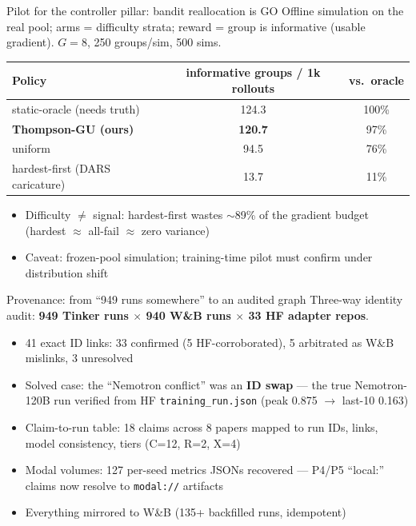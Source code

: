 \documentclass[aspectratio=169,11pt]{beamer}
\newcommand{\good}[1]{\textcolor{green!50!black}{#1}}
\newcommand{\warn}[1]{\textcolor{orange!80!black}{#1}}
\begin{document}
\begin{frame}{Pilot for the controller pillar: bandit reallocation is GO}
  Offline simulation on the real pool; arms = difficulty strata; reward =
  group is informative (usable gradient). $G{=}8$, 250 groups/sim, 500 sims.
  \vspace{4pt}
  \centering
  \begin{tabular}{@{}lcc@{}}
    \toprule
    Policy & informative groups / 1k rollouts & vs.\ oracle \\
    \midrule
    static-oracle (needs truth) & 124.3 & 100\% \\
    \textbf{Thompson-GU (ours)} & \textbf{120.7} & \good{97\%} \\
    uniform & 94.5 & 76\% \\
    hardest-first (DARS caricature) & \warn{13.7} & \warn{11\%} \\
    \bottomrule
  \end{tabular}
  \vspace{6pt}
  \begin{itemize}
    \item Difficulty $\ne$ signal: hardest-first wastes $\sim$89\% of the
          gradient budget (hardest $\approx$ all-fail $\approx$ zero variance)
    \item Caveat: frozen-pool simulation; training-time pilot must confirm
          under distribution shift
  \end{itemize}
\end{frame}

\begin{frame}{Provenance: from ``949 runs somewhere'' to an audited graph}
  Three-way identity audit: \textbf{949 Tinker runs $\times$ 940 W\&B runs
  $\times$ 33 HF adapter repos}.
  \vspace{4pt}
  \begin{itemize}
    \item 41 exact ID links: \good{33 confirmed} (5 HF-corroborated),
          \warn{5 arbitrated as W\&B mislinks}, 3 unresolved
    \item Solved case: the ``Nemotron conflict'' was an \textbf{ID swap} ---
          the true Nemotron-120B run verified from HF
          \texttt{training\_run.json} (peak 0.875 $\to$ last-10 0.163)
    \item Claim-to-run table: 18 claims across 8 papers mapped to run IDs,
          links, model consistency, tiers (C=12, R=2, X=4)
    \item Modal volumes: 127 per-seed metrics JSONs recovered --- P4/P5
          ``local:'' claims now resolve to \texttt{modal://} artifacts
    \item Everything mirrored to W\&B (135+ backfilled runs, idempotent)
  \end{itemize}
\end{frame}
\end{document}
